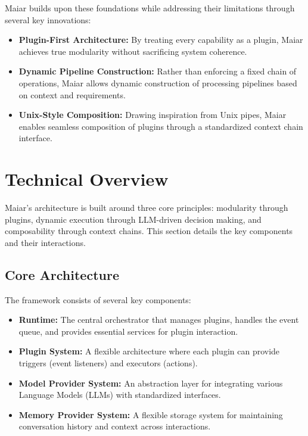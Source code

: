 \documentclass[12pt]{article}
\begin{document}
Maiar builds upon these foundations while addressing their limitations through several key innovations:

\begin{itemize}
    \item \textbf{Plugin-First Architecture:} By treating every capability as a plugin, Maiar achieves true modularity without sacrificing system coherence.
    
    \item \textbf{Dynamic Pipeline Construction:} Rather than enforcing a fixed chain of operations, Maiar allows dynamic construction of processing pipelines based on context and requirements.
    
    \item \textbf{Unix-Style Composition:} Drawing inspiration from Unix pipes, Maiar enables seamless composition of plugins through a standardized context chain interface.
\end{itemize}

\section{Technical Overview}
Maiar's architecture is built around three core principles: modularity through plugins, dynamic execution through LLM-driven decision making, and composability through context chains. This section details the key components and their interactions.

\subsection{Core Architecture}
The framework consists of several key components:

\begin{itemize}
    \item \textbf{Runtime:} The central orchestrator that manages plugins, handles the event queue, and provides essential services for plugin interaction.
    
    \item \textbf{Plugin System:} A flexible architecture where each plugin can provide triggers (event listeners) and executors (actions).
    
    \item \textbf{Model Provider System:} An abstraction layer for integrating various Language Models (LLMs) with standardized interfaces.
    
    \item \textbf{Memory Provider System:} A flexible storage system for maintaining conversation history and context across interactions.
\end{itemize}
\end{document}

